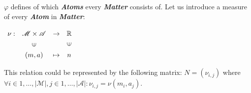 \documentclass[a4paper]{article}
\begin{document}
$\varphi $ defines of which \textit{\textbf{Atoms}} every \textit{\textbf{Matter}} consists of. Let us introduce a measure of every \textit{\textbf{Atom}} in \textit{\textbf{Matter}}:

$\renewcommand{\arraystretch}{1.3}
\begin{array}[c]{ccccc}
{\nu}:&\mathscr{M} \times \mathscr{A} &\rightarrow&\mathbb{R}\\
&\rotatebox[origin=c]{90}{{$\in$}}&&\rotatebox{90}{$\in$}&\\
&(m, a)&\mapsto& n
\end{array}$

This relation could be represented by the following matrix:
$ {N}=\left(\nu_{{i,j}}\right) $ where $ \forall i \in 1,\dots,|\mathscr{M}|, j \in 1,\dots,|\mathscr{A}| : \nu_{{i,j}}=\nu \left( m_{{i}},a_{{j}} \right) $.
\end{document}
